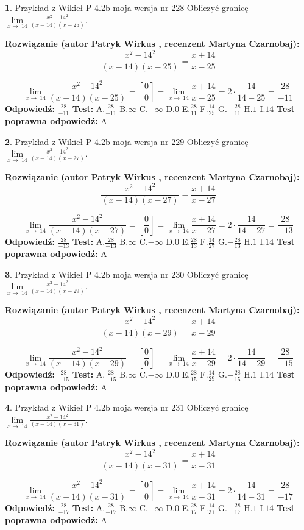 \documentclass[12pt, a4paper]{article}
\theoremstyle{definition} %
\newtheorem{zad}{}
\newcommand{\zadStart}[1]{\begin{zad}#1\newline}
\newcommand{\zadStop}{\end{zad}}
\newcommand{\rozwStart}[2]{\noindent \textbf{Rozwiązanie (autor #1 , recenzent #2): }\newline}
\newcommand{\rozwStop}{\newline}
\newcommand{\odpStart}{\noindent \textbf{Odpowiedź:}\newline}
\newcommand{\odpStop}{\newline}
\newcommand{\testStart}{\noindent \textbf{Test:}\newline}
\newcommand{\testStop}{\newline}
\newcommand{\kluczStart}{\noindent \textbf{Test poprawna odpowiedź:}\newline}
\newcommand{\kluczStop}{\newline}
\begin{document}
\zadStart{Przykład z Wikieł P 4.2b moja wersja nr 228}
Obliczyć granicę $\lim\limits_{x\to\ 14}\frac{x^{2}-14^{2}}{(x-14)(x-25)}$.
\zadStop
\rozwStart{Patryk Wirkus}{Martyna Czarnobaj}
$$\frac{x^{2}-14^{2}}{(x-14)(x-25)}=\frac{x+14}{x-25}$$

$$\lim\limits_{x\to\ 14}\frac{x^{2}-14^{2}}{(x-14)(x-25)}=[\frac{0}{0}]=\lim\limits_{x\to\ 14}\frac{x+14}{x-25}=2 \cdot \frac{14}{14-25} = \frac{28}{-11}$$
\rozwStop
\odpStart
$\frac{28}{-11}$
\odpStop
\testStart
A.$\frac{28}{-11}$
B.$\infty$
C.$-\infty$
D.$0$
E.$\frac{28}{11}$
F.$\frac{14}{25}$
G.$-\frac{28}{11}$
H.$1$
I.$14$
\testStop
\kluczStart
A
\kluczStop



\zadStart{Przykład z Wikieł P 4.2b moja wersja nr 229}
Obliczyć granicę $\lim\limits_{x\to\ 14}\frac{x^{2}-14^{2}}{(x-14)(x-27)}$.
\zadStop
\rozwStart{Patryk Wirkus}{Martyna Czarnobaj}
$$\frac{x^{2}-14^{2}}{(x-14)(x-27)}=\frac{x+14}{x-27}$$

$$\lim\limits_{x\to\ 14}\frac{x^{2}-14^{2}}{(x-14)(x-27)}=[\frac{0}{0}]=\lim\limits_{x\to\ 14}\frac{x+14}{x-27}=2 \cdot \frac{14}{14-27} = \frac{28}{-13}$$
\rozwStop
\odpStart
$\frac{28}{-13}$
\odpStop
\testStart
A.$\frac{28}{-13}$
B.$\infty$
C.$-\infty$
D.$0$
E.$\frac{28}{13}$
F.$\frac{14}{27}$
G.$-\frac{28}{13}$
H.$1$
I.$14$
\testStop
\kluczStart
A
\kluczStop



\zadStart{Przykład z Wikieł P 4.2b moja wersja nr 230}
Obliczyć granicę $\lim\limits_{x\to\ 14}\frac{x^{2}-14^{2}}{(x-14)(x-29)}$.
\zadStop
\rozwStart{Patryk Wirkus}{Martyna Czarnobaj}
$$\frac{x^{2}-14^{2}}{(x-14)(x-29)}=\frac{x+14}{x-29}$$

$$\lim\limits_{x\to\ 14}\frac{x^{2}-14^{2}}{(x-14)(x-29)}=[\frac{0}{0}]=\lim\limits_{x\to\ 14}\frac{x+14}{x-29}=2 \cdot \frac{14}{14-29} = \frac{28}{-15}$$
\rozwStop
\odpStart
$\frac{28}{-15}$
\odpStop
\testStart
A.$\frac{28}{-15}$
B.$\infty$
C.$-\infty$
D.$0$
E.$\frac{28}{15}$
F.$\frac{14}{29}$
G.$-\frac{28}{15}$
H.$1$
I.$14$
\testStop
\kluczStart
A
\kluczStop



\zadStart{Przykład z Wikieł P 4.2b moja wersja nr 231}
Obliczyć granicę $\lim\limits_{x\to\ 14}\frac{x^{2}-14^{2}}{(x-14)(x-31)}$.
\zadStop
\rozwStart{Patryk Wirkus}{Martyna Czarnobaj}
$$\frac{x^{2}-14^{2}}{(x-14)(x-31)}=\frac{x+14}{x-31}$$

$$\lim\limits_{x\to\ 14}\frac{x^{2}-14^{2}}{(x-14)(x-31)}=[\frac{0}{0}]=\lim\limits_{x\to\ 14}\frac{x+14}{x-31}=2 \cdot \frac{14}{14-31} = \frac{28}{-17}$$
\rozwStop
\odpStart
$\frac{28}{-17}$
\odpStop
\testStart
A.$\frac{28}{-17}$
B.$\infty$
C.$-\infty$
D.$0$
E.$\frac{28}{17}$
F.$\frac{14}{31}$
G.$-\frac{28}{17}$
H.$1$
I.$14$
\testStop
\kluczStart
A
\kluczStop
\end{document}
